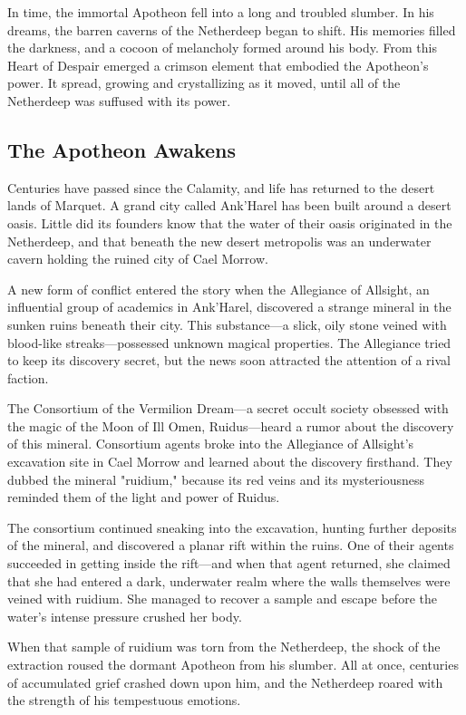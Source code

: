 \documentclass[10pt,a4paper,twoside,bg=print,twocolumn,openany,nodeprecatedcode]{dndbook}
\begin{document}
In time, the immortal Apotheon fell into a long and troubled slumber. In his dreams, the barren caverns of the Netherdeep began to shift. His memories filled the darkness, and a cocoon of melancholy formed around his body. From this Heart of Despair emerged a crimson element that embodied the Apotheon's power. It spread, growing and crystallizing as it moved, until all of the Netherdeep was suffused with its power.

\subsection{The Apotheon Awakens}
Centuries have passed since the Calamity, and life has returned to the desert lands of Marquet. A grand city called Ank'Harel has been built around a desert oasis. Little did its founders know that the water of their oasis originated in the Netherdeep, and that beneath the new desert metropolis was an underwater cavern holding the ruined city of Cael Morrow.

A new form of conflict entered the story when the Allegiance of Allsight, an influential group of academics in Ank'Harel, discovered a strange mineral in the sunken ruins beneath their city. This substance—a slick, oily stone veined with blood-like streaks—possessed unknown magical properties. The Allegiance tried to keep its discovery secret, but the news soon attracted the attention of a rival faction.

The Consortium of the Vermilion Dream—a secret occult society obsessed with the magic of the Moon of Ill Omen, Ruidus—heard a rumor about the discovery of this mineral. Consortium agents broke into the Allegiance of Allsight's excavation site in Cael Morrow and learned about the discovery firsthand. They dubbed the mineral "ruidium," because its red veins and its mysteriousness reminded them of the light and power of Ruidus.

The consortium continued sneaking into the excavation, hunting further deposits of the mineral, and discovered a planar rift within the ruins. One of their agents succeeded in getting inside the rift—and when that agent returned, she claimed that she had entered a dark, underwater realm where the walls themselves were veined with ruidium. She managed to recover a sample and escape before the water's intense pressure crushed her body.

When that sample of ruidium was torn from the Netherdeep, the shock of the extraction roused the dormant Apotheon from his slumber. All at once, centuries of accumulated grief crashed down upon him, and the Netherdeep roared with the strength of his tempestuous emotions.
\end{document}
